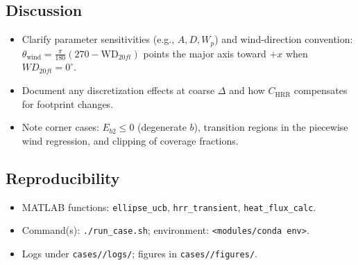 \documentclass[../report/case_report.tex]{subfiles}
\begin{document}
\subsection{Discussion}
\begin{itemize}[nosep]
  \item Clarify parameter sensitivities (e.g., $A,D,W_p$) and wind-direction convention: $\theta_{\mathrm{wind}}=\frac{\pi}{180}(270-\mathrm{WD}_{20ft})$ points the major axis toward $+x$ when $WD_{20ft}=0^\circ$.
  \item Document any discretization effects at coarse $\Delta$ and how $C_\mathrm{HRR}$ compensates for footprint changes.
  \item Note corner cases: $E_{b2}\le 0$ (degenerate $b$), transition regions in the piecewise wind regression, and clipping of coverage fractions.
\end{itemize}

\subsection*{Reproducibility}
\begin{itemize}[nosep]
  \item MATLAB functions: \texttt{ellipse\_ucb}, \texttt{hrr\_transient}, \texttt{heat\_flux\_calc}.
  \item Command(s): \texttt{./run\_case.sh}; environment: \texttt{<modules/conda env>}.
  \item Logs under \texttt{cases/\CaseID/logs/}; figures in \texttt{cases/\CaseID/figures/}.
\end{itemize}
\end{document}
